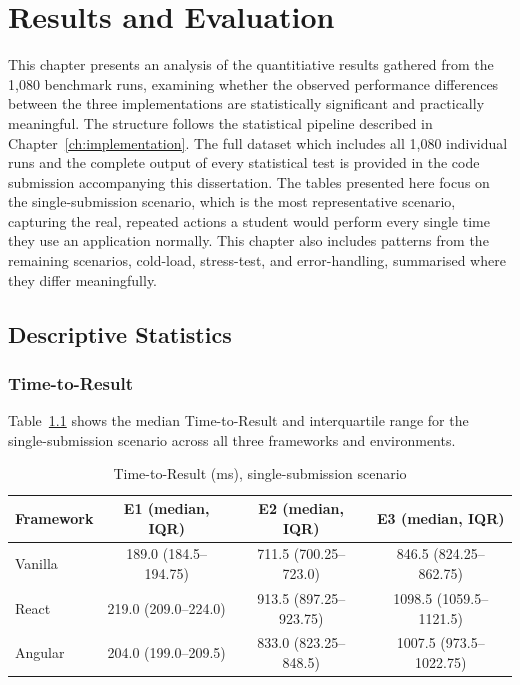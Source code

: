 \documentclass[11pt,a4paper]{report}
\begin{document}
\chapter{Results and Evaluation}
\label{ch:results}

This chapter presents an analysis of the quantitiative results gathered from the 1,080 benchmark runs, examining whether the observed performance differences between the three implementations are statistically significant and practically meaningful. The structure follows the statistical pipeline described in Chapter~\ref{ch:implementation}. The full dataset which includes all 1,080 individual runs and the complete output of every statistical test is provided in the code submission accompanying this dissertation. The tables presented here focus on the single-submission scenario, which is the most representative scenario, capturing the real, repeated actions a student would perform every single time they use an application normally. This chapter also includes patterns from the remaining scenarios, cold-load, stress-test, and error-handling, summarised where they differ meaningfully.   

\section{Descriptive Statistics}

\subsection{Time-to-Result}

Table~\ref{tab:ttr-summary} shows the median Time-to-Result and interquartile range for the single-submission scenario across all three frameworks and environments.

\begin{table}[H]
\centering
\caption{Time-to-Result (ms), single-submission scenario}
\label{tab:ttr-summary}
\begin{tabular}{lccc}
\toprule
Framework & E1 (median, IQR) & E2 (median, IQR) & E3 (median, IQR) \\
\midrule
Vanilla  & 189.0 (184.5--194.75) & 711.5 (700.25--723.0) & 846.5 (824.25--862.75) \\
React    & 219.0 (209.0--224.0)  & 913.5 (897.25--923.75) & 1098.5 (1059.5--1121.5) \\
Angular  & 204.0 (199.0--209.5)  & 833.0 (823.25--848.5)  & 1007.5 (973.5--1022.75) \\
\bottomrule
\end{tabular}
\end{table}
\end{document}
